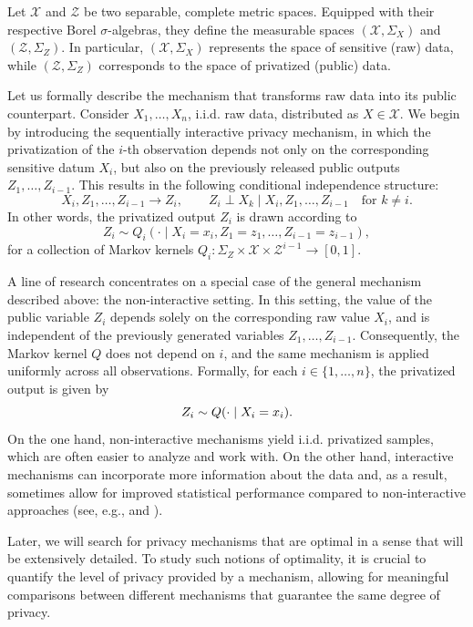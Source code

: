 \documentclass[a4paper, 11pt]{article}
\theoremstyle{definition}
\begin{document}
{Let $\mathcal{X}$ and $\mathcal{Z}$ be two separable, complete metric spaces. Equipped with their respective Borel $\sigma$-algebras, they define the measurable spaces $(\mathcal{X}, \Sigma_X)$ and $(\mathcal{Z}, \Sigma_Z)$. In particular, $(\mathcal{X}, \Sigma_X)$ represents the space of sensitive (raw) data, while $(\mathcal{Z}, \Sigma_Z)$ corresponds to the space of privatized (public) data.

Let us formally describe the mechanism that transforms raw data into its public counterpart. Consider $X_1, \dots, X_n$, i.i.d. raw data, distributed as $X \in \mathcal{X}$. We begin by introducing the sequentially interactive privacy mechanism, in which the privatization of the $i$-th observation depends not only on the corresponding sensitive datum $X_i$, but also on the previously released public outputs $Z_1, \dots, Z_{i-1}$. This results in the following conditional independence structure:
$$
X_i, Z_1, \dots, Z_{i-1} \rightarrow Z_i, \qquad Z_i \perp X_k \mid X_i, Z_1, \dots, Z_{i-1} \quad \text{for } k \neq i.
$$
In other words, the privatized output $Z_i$ is drawn according to
$$
Z_i \sim Q_i(\cdot \mid X_i = x_i, Z_1 = z_1, \dots, Z_{i-1} = z_{i-1}),
$$
for a collection of Markov kernels $Q_i : \Sigma_Z \times \mathcal{X} \times \mathcal{Z}^{i-1} \rightarrow [0,1]$.

A line of research concentrates on a special case of the general mechanism described above: the non-interactive setting. In this setting, the value of the public variable $Z_i$ depends solely on the corresponding raw value $X_i$, and is independent of the previously generated variables $Z_1, \dots, Z_{i-1}$. Consequently, the Markov kernel $Q$ does not depend on $i$, and the same mechanism is applied uniformly across all observations. Formally, for each $i \in \{1, \dots, n\}$, the privatized output is given by
\begin{equation}{\label{eq: drawn Z nonint}}
 Z_i \sim Q(\cdot \mid X_i = x_i).   
\end{equation}
On the one hand, non-interactive mechanisms yield i.i.d. privatized samples, which are often easier to analyze and work with. On the other hand, interactive mechanisms can incorporate more information about the data and, as a result, sometimes allow for improved statistical performance compared to non-interactive approaches (see, e.g., \cite{ButKlo25} and \cite{Kro24}).

Later, we will search for privacy mechanisms that are optimal in a sense that will be extensively detailed. %
To study such notions of optimality, it is crucial to quantify the level of privacy provided by a mechanism, allowing for meaningful comparisons between different mechanisms that guarantee the same degree of privacy.

}
\end{document}
